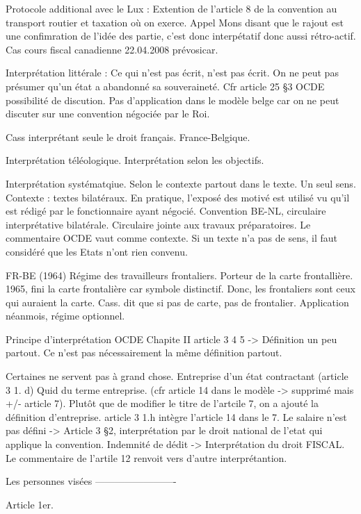 \documentclass{book}
\begin{document}
Protocole additional avec le Lux : Extention de l’article 8 de la convention au transport routier et taxation où on exerce.
Appel Mons disant que le rajout est une confimration de l’idée des partie, c’est donc interpétatif donc aussi rétro-actif. Cas cours fiscal canadienne 22.04.2008 prévosicar.

Interprétation littérale : Ce qui n’est pas écrit, n’est pas écrit. On ne peut pas présumer qu’un état a abandonné sa souveraineté. Cfr article 25 §3 OCDE possibilité de discution. Pas d’application dans le modèle belge car on ne peut discuter sur une convention négociée par le Roi. 

Cass interprétant seule le droit français. France-Belgique.

Interprétation téléologique. Interprétation selon les objectifs.

Interprétation systématqiue. Selon le contexte partout dans le texte. Un seul sens.  Contexte : textes bilatéraux. En pratique, l’exposé des motivé est utilisé vu qu’il est rédigé par le fonctionnaire ayant négocié. Convention BE-NL, circulaire interprétative bilatérale. Circulaire jointe aux travaux préparatoires. Le commentaire OCDE vaut comme contexte. Si un texte n’a pas de sens, il faut considéré que les Etats n’ont rien convenu.

FR-BE (1964) Régime des travailleurs frontaliers. Porteur de la carte frontallière. 1965, fini la carte frontalière car symbole distinctif. Donc, les frontaliers sont ceux qui auraient la carte. Cass. dit que si pas de carte, pas de frontalier. Application néanmois, régime optionnel.

Principe d’interprétation OCDE
Chapite II article 3 4 5 -> Définition un peu partout. Ce n’est pas nécessairement la même définition partout.

Certaines ne servent pas à grand chose. Entreprise d’un état contractant (article 3 1. d)
Quid du terme entreprise. (cfr article 14 dans le modèle -> supprimé mais +/- article 7). Plutôt que de modifier le titre de l’artcile 7, on a ajouté la définition d’entreprise. article 3 1.h intègre l’article 14 dans le 7. Le salaire n’est pas défini -> Article 3 §2, interprétation par le droit national de l’etat qui applique la convention. Indemnité de dédit -> Interprétation du droit FISCAL. Le commentaire de l’artile 12 renvoit vers d’autre interprétantion.


Les personnes visées
-------------------------

Article 1er. 
\end{document}
